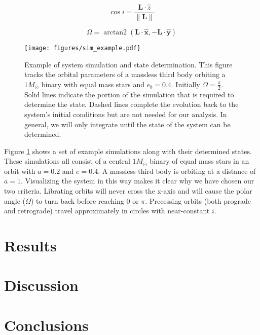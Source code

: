 \documentclass[twocolumn]{aastex631}
\DeclareMathOperator{\arctantwo}{arctan2}
\begin{document}
\begin{equation}
    \cos{i} = \frac{\bm{L} \cdot \hat{z}}{\|\bm{L}\|}
    \label{eq:inclination}
\end{equation}

\begin{equation}
    \Omega = \arctantwo (\bm{L} \cdot \hat{\bm{x}}, -\bm{L} \cdot \hat{\bm{y}})
    \label{eq:omega}
\end{equation}


\begin{figure}
    \begin{centering}
        \texttt{[image: figures/sim\_example.pdf]}
        \caption{Example of system simulation and state determination. This figure tracks the orbital parameters
        of a massless third body orbiting a $1 M_\odot$ binary with equal mass stars and $e_b = 0.4$.
        Initially $\Omega = \frac{\pi}{2}$.
        Solid lines indicate
        the portion of the simulation that is required to determine the state. Dashed lines complete the evolution back to the system's
        initial conditions but are not needed for our analysis. In general, we will only integrate until the state of the system can be
        determined.}
        \label{fig:sim_example}
    \end{centering}
\end{figure}

Figure \ref{fig:sim_example} shows a set of example simulations along with their determined states.
These simulations all consist of a central $1 M_\odot$ binary of equal mass stars in an orbit with $a=0.2$ and $e=0.4$.
A massless third body is orbiting at a distance of $a=1$.
Visualizing the system in this way makes it clear why we have chosen our two criteria. Librating orbits will never cross the x-axis
and will cause the polar angle ($\Omega$) to turn back before reaching $0$ or $\pi$. Precessing orbits (both prograde and retrograde)
travel approximately in circles with near-constant $i$.

\section{Results}
\label{sec:results}

\section{Discussion}
\label{sec:discussion}

\section{Conclusions}
\label{sec:conclusions}
\end{document}
